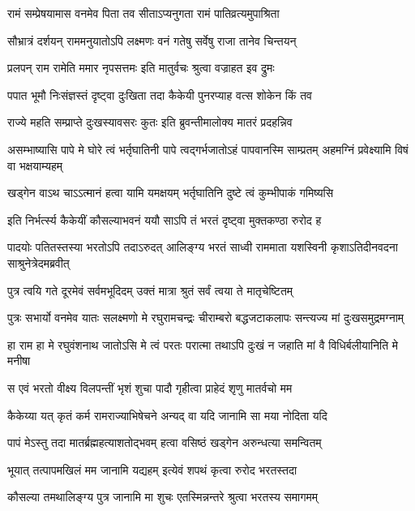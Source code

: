\twolineshloka
{रामं सम्प्रेषयामास वनमेव पिता तव}
{सीताऽप्यनुगता रामं पातिव्रत्यमुपाश्रिता} %

\twolineshloka
{सौभ्रात्रं दर्शयन् राममनुयातोऽपि लक्ष्मणः}
{वनं गतेषु सर्वेषु राजा तानेव चिन्तयन्} %

\twolineshloka
{प्रलपन् राम रामेति ममार नृपसत्तमः}
{इति मातुर्वचः श्रुत्वा वज्राहत इव द्रुमः} %

\twolineshloka
{पपात भूमौ निःसंज्ञस्तं दृष्ट्वा दुःखिता तदा}
{कैकेयी पुनरप्याह वत्स शोकेन किं तव} %

\twolineshloka
{राज्ये महति सम्प्राप्ते दुःखस्यावसरः कुतः}
{इति ब्रुवन्तीमालोक्य मातरं प्रदहन्निव} %

\threelineshloka
{असम्भाष्यासि पापे मे घोरे त्वं भर्तृघातिनी}
{पापे त्वद्गर्भजातोऽहं पापवानस्मि साम्प्रतम्}
{अहमग्निं प्रवेक्ष्यामि विषं वा भक्षयाम्यहम्} %

\twolineshloka
{खड्गेन वाऽथ चाऽऽत्मानं हत्वा यामि यमक्षयम्}
{भर्तृघातिनि दुष्टे त्वं कुम्भीपाकं गमिष्यसि} %

\twolineshloka
{इति निर्भर्त्स्य कैकेयीं कौसल्याभवनं ययौ}
{साऽपि तं भरतं दृष्ट्वा मुक्तकण्ठा रुरोद ह} %

\threelineshloka
{पादयोः पतितस्तस्या भरतोऽपि तदाऽरुदत्}
{आलिङ्ग्य भरतं साध्वी राममाता यशस्विनी}
{कृशाऽतिदीनवदना साश्रुनेत्रेदमब्रवीत्} %

\twolineshloka
{पुत्र त्वयि गते दूरमेवं सर्वमभूदिदम्}
{उक्तं मात्रा श्रुतं सर्वं त्वया ते मातृचेष्टितम्} %

\fourlineindentedshloka
{पुत्रः सभार्यो वनमेव यातः}
{सलक्ष्मणो मे रघुरामचन्द्रः}
{चीराम्बरो बद्धजटाकलापः}
{सन्त्यज्य मां दुःखसमुद्रमग्नाम्} %

\fourlineindentedshloka
{हा राम हा मे रघुवंशनाथ}
{जातोऽसि मे त्वं परतः परात्मा}
{तथाऽपि दुःखं न जहाति मां वै}
{विधिर्बलीयानिति मे मनीषा} %

\twolineshloka
{स एवं भरतो वीक्ष्य विलपन्तीं भृशं शुचा}
{पादौ गृहीत्वा प्राहेदं शृणु मातर्वचो मम} %

\twolineshloka
{कैकेय्या यत् कृतं कर्म रामराज्याभिषेचने}
{अन्यद् वा यदि जानामि सा मया नोदिता यदि} %

\twolineshloka
{पापं मेऽस्तु तदा मातर्ब्रह्महत्याशतोद्भवम्}
{हत्वा वसिष्ठं खड्गेन अरुन्धत्या समन्वितम्} %

\twolineshloka
{भूयात् तत्पापमखिलं मम जानामि यद्यहम्}
{इत्येवं शपथं कृत्वा रुरोद भरतस्तदा} %

\twolineshloka
{कौसल्या तमथालिङ्ग्य पुत्र जानामि मा शुचः}
{एतस्मिन्नन्तरे श्रुत्वा भरतस्य समागमम्} %

